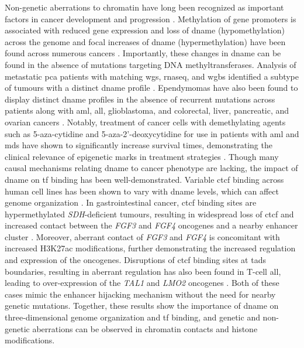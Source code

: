 Non-genetic aberrations to chromatin have long been recognized as important factors in cancer development and progression \cite{jonesCancerepigeneticsComesAge1999,jonesFundamentalRoleEpigenetic2002}.
Methylation of gene promoters is associated with reduced gene expression and loss of \gls{dname} (hypomethylation) across the genome and focal increases of \gls{dname} (hypermethylation) have been found across numerous cancers \cite{jonesFundamentalRoleEpigenetic2002,feinbergHistoryCancerEpigenetics2004}.
Importantly, these changes in \gls{dname} can be found in the absence of mutations targeting DNA methyltransferases.
Analysis of  metastatic \gls{pca} patients with matching \gls{wgs}, \gls{rnaseq}, and \gls{wgbs} identified a subtype of tumours with a distinct \gls{dname} profile \cite{zhaoDNAMethylationLandscape2020}.
Ependymomas have also been found to display distinct \gls{dname} profiles in the absence of recurrent mutations across patients \cite{mackEpigenomicAlterationsDefine2014} along with \gls{aml}, \gls{all}, glioblastoma, and colorectal, liver, pancreatic, and ovarian cancers \cite{issaCpGIslandMethylator2004}.
Notably, treatment of cancer cells with demethylating agents such as 5-aza-cytidine and 5-aza-2'-deoxycytidine for use in patients with \gls{aml} and \gls{mds} have shown to significantly increase survival times, demonstrating the clinical relevance of epigenetic marks in treatment strategies \cite{schmelzInductionGeneExpression2005,azadFutureEpigeneticTherapy2013,kellyEpigeneticModificationsTherapeutic2010}.
Though many causal mechanisms relating \gls{dname} to cancer phenotype are lacking, the impact of \gls{dname} on \gls{tf} binding has been well-demonstrated.
Variable \gls{ctcf} binding across human cell lines has been shown to vary with \gls{dname} levels, which can affect genome organization \cite{wangWidespreadPlasticityCTCF2012,mauranoRoleDNAMethylation2015}.
In gastrointestinal cancer, \gls{ctcf} binding sites are hypermethylated \emph{SDH}-deficient tumours, resulting in widespread loss of \gls{ctcf} and increased contact between the \emph{FGF3} and \emph{FGF4} oncogenes and a nearby enhancer cluster \cite{flavahanAlteredChromosomalTopology2019}.
Moreover, aberrant contact of \emph{FGF3} and \emph{FGF4} is concomitant with increased H3K27ac modifications, further demonstrating the increased regulation and expression of the oncogenes.
Disruptions of \gls{ctcf} binding sites at \glspl{tad} boundaries, resulting in aberrant regulation has also been found in T-cell \gls{all}, leading to over-expression of the \emph{TAL1} and \emph{LMO2} oncogenes \cite{hniszActivationProtooncogenesDisruption2016}.
Both of these cases mimic the enhancer hijacking mechanism without the need for nearby genetic mutations.
Together, these results show the importance of \gls{dname} on three-dimensional genome organization and \gls{tf} binding, and genetic and non-genetic aberrations can be observed in chromatin contacts and histone modifications.

